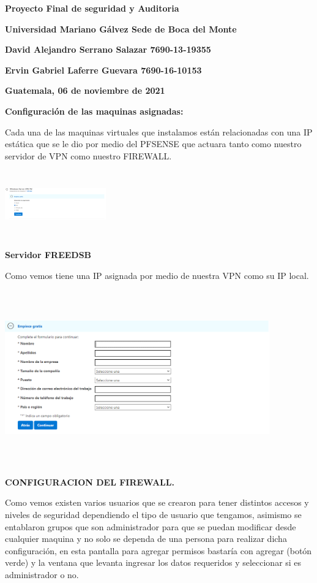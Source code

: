 \documentclass[
]{article}
\author{}
\date{}
\begin{document}
\textbf{Proyecto Final de seguridad y Auditoria}

\textbf{Universidad Mariano Gálvez Sede de Boca del Monte}

\textbf{David Alejandro Serrano Salazar 7690-13-19355}

\textbf{Ervin Gabriel Laferre Guevara 7690-16-10153}

\textbf{Guatemala, 06 de noviembre de 2021}

\textbf{Configuración de las maquinas asignadas:}

Cada una de las maquinas virtuales que instalamos están relacionadas con
una IP estática que se le dio por medio del PFSENSE que actuara tanto
como nuestro servidor de VPN como nuestro FIREWALL.

\includegraphics[width=1.71875in,height=1.13542in]{media/image1.png}

\textbf{Servidor FREEDSB}

Como vemos tiene una IP asignada por medio de nuestra VPN como su IP
local.

\includegraphics[width=4.5in,height=2.96875in]{media/image2.png}

\textbf{CONFIGURACION DEL FIREWALL.}

Como vemos existen varios usuarios que se crearon para tener distintos
accesos y niveles de seguridad dependiendo el tipo de usuario que
tengamos, asimismo se entablaron grupos que son administrador para que
se puedan modificar desde cualquier maquina y no solo se dependa de una
persona para realizar dicha configuración, en esta pantalla para agregar
permisos bastaría con agregar (botón verde) y la ventana que levanta
ingresar los datos requeridos y seleccionar si es administrador o no.
\end{document}
